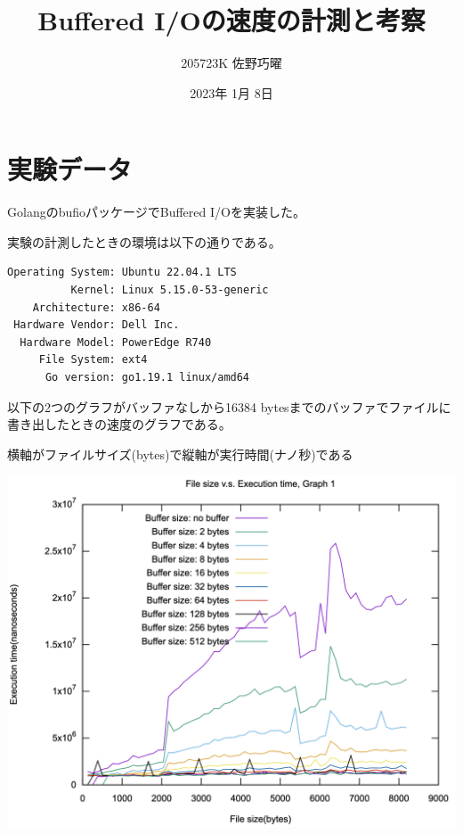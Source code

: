 \documentclass[
  12pt,
  a4j]{ltjarticle}
\title{Buffered I/Oの速度の計測と考察}
\author{205723K 佐野巧曜}
\date{2023年 1月 8日}
\let\origfigure\figure
\let\endorigfigure\endfigure
\renewenvironment{figure}[1][2] {
    \expandafter\origfigure\expandafter[H]
} {
    \endorigfigure
}
\begin{document}
\maketitle

\hypertarget{ux5b9fux9a13ux30c7ux30fcux30bf}{%
\section{実験データ}\label{ux5b9fux9a13ux30c7ux30fcux30bf}}

GolangのbufioパッケージでBuffered I/Oを実装した。

実験の計測したときの環境は以下の通りである。

\begin{lstlisting}
Operating System: Ubuntu 22.04.1 LTS
          Kernel: Linux 5.15.0-53-generic
    Architecture: x86-64
 Hardware Vendor: Dell Inc.
  Hardware Model: PowerEdge R740
     File System: ext4
      Go version: go1.19.1 linux/amd64
\end{lstlisting}

以下の2つのグラフがバッファなしから16384
bytesまでのバッファでファイルに書き出したときの速度のグラフである。

横軸がファイルサイズ(bytes)で縦軸が実行時間(ナノ秒)である

\begin{figure}
\centering
\includegraphics{../png/graph1.png}
\caption{512 bytes以内範囲のバッファの書き出しの速度のグラフ}
\end{figure}
\end{document}
